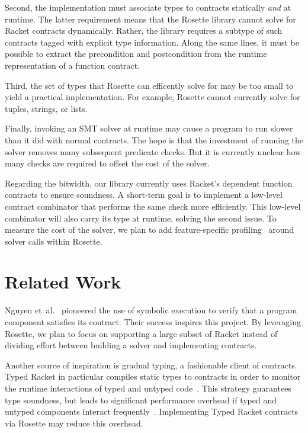 \documentclass[preprint,9pt]{sigplanconf}
\begin{document}
Second, the implementation must associate types to contracts statically \emph{and} at runtime.
The latter requirement means that the Rosette library cannot solve for Racket contracts dynamically.
Rather, the library requires a subtype of such contracts tagged with explicit type information. %
Along the same lines, it must be possible to extract the precondition and postcondition from the runtime representation of a function contract.

Third, the set of types that Rosette can efficently solve for may be too small to yield a practical implementation.
For example, Rosette cannot currently solve for tuples, strings, or lists.

Finally, invoking an SMT solver at runtime may cause a program to run slower than it did with normal contracts.
The hope is that the investment of running the solver removes many subsequent predicate checks.
But it is currently unclear how many checks are required to offset the cost of the solver.

Regarding the bitwidth, our library currently uses Racket's dependent function contracts to ensure soundness.
A short-term goal is to implement a low-level contract combinator that performs the same check more efficiently.
This low-level combinator will also carry its type at runtime, solving the second issue.
To measure the cost of the solver, we plan to add feature-specific profiling~\cite{saf-cc-2015} around solver calls within Rosette.


\section{Related Work}

Nguyen et~al.~\cite{ntv-icfp-2014} pioneered the use of symbolic execution to verify that a program component satisfies its contract.
Their success inspires this project.
By leveraging Rosette, we plan to focus on supporting a large subset of Racket instead of dividing effort between building a solver and implementing contracts.

Another source of inspiration is gradual typing, a fashionable client of contracts.
Typed Racket in particular compiles static types to contracts in order to monitor the runtime interactions of typed and untyped code~\cite{tf-popl-2008}.
This strategy guarantees type soundness, but leads to significant performance overhead if typed and untyped components interact frequently~\cite{tfgnfv-popl-2016}.
Implementing Typed Racket contracts via Rosette may reduce this overhead.
\end{document}
